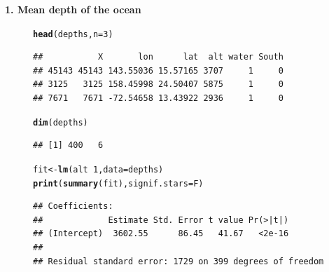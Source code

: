 \documentclass[10pt]{beamer}\usepackage[]{graphicx}\usepackage[]{color}
\makeatletter
\newcommand{\hlnum}[1]{\textcolor[rgb]{0.686,0.059,0.569}{#1}}%
\newcommand{\hlopt}[1]{\textcolor[rgb]{0,0,0}{#1}}%
\newcommand{\hlstd}[1]{\textcolor[rgb]{0.345,0.345,0.345}{#1}}%
\newcommand{\hlkwb}[1]{\textcolor[rgb]{0.69,0.353,0.396}{#1}}%
\newcommand{\hlkwc}[1]{\textcolor[rgb]{0.333,0.667,0.333}{#1}}%
\newcommand{\hlkwd}[1]{\textcolor[rgb]{0.737,0.353,0.396}{\textbf{#1}}}%
\newenvironment{kframe}{%
 \def\at@end@of@kframe{}%
 \ifinner\ifhmode%
  \def\at@end@of@kframe{\end{minipage}}%
  \begin{minipage}{\columnwidth}%
 \fi\fi%
 \def\FrameCommand##1{\hskip\@totalleftmargin \hskip-\fboxsep
 \colorbox{shadecolor}{##1}\hskip-\fboxsep
     \hskip-\linewidth \hskip-\@totalleftmargin \hskip\columnwidth}%
 \MakeFramed {\advance\hsize-\width
   \@totalleftmargin\z@ \linewidth\hsize
   \@setminipage}}%
 {\par\unskip\endMakeFramed%
 \at@end@of@kframe}
\newenvironment{knitrout}{}{} %
\makeatother
\begin{document}
\begin{frame}
\vspace*{-1.50in}
\textbf{1. Mean depth of the ocean}



\begin{figure}
	\begin{minipage}[h]{0.40\linewidth}
\begin{knitrout}\tiny
{}\color{fgcolor}\begin{kframe}
\begin{alltt}
\hlkwd{head}\hlstd{(depths,} \hlkwc{n}\hlstd{=}\hlnum{3}\hlstd{)}
\end{alltt}
\begin{verbatim}
##           X       lon      lat  alt water South
## 45143 45143 143.55036 15.57165 3707     1     0
## 3125   3125 158.45998 24.50407 5875     1     0
## 7671   7671 -72.54658 13.43922 2936     1     0
\end{verbatim}
\begin{alltt}
\hlkwd{dim}\hlstd{(depths)}
\end{alltt}
\begin{verbatim}
## [1] 400   6
\end{verbatim}
\end{kframe}
\end{knitrout}
		
	\end{minipage}
	\hspace{0.4cm}
	\begin{minipage}[h]{0.50\linewidth}
\begin{knitrout}\tiny
{}\color{fgcolor}\begin{kframe}
\begin{alltt}
\hlstd{fit} \hlkwb{<-} \hlkwd{lm}\hlstd{(alt} \hlopt{~} \hlnum{1}\hlstd{,} \hlkwc{data} \hlstd{= depths)}
\hlkwd{print}\hlstd{(}\hlkwd{summary}\hlstd{(fit),} \hlkwc{signif.stars} \hlstd{= F)}
\end{alltt}
\begin{verbatim}
## Coefficients:
##             Estimate Std. Error t value Pr(>|t|)
## (Intercept)  3602.55      86.45   41.67   <2e-16
## 
## Residual standard error: 1729 on 399 degrees of freedom
\end{verbatim}
\end{kframe}
\end{knitrout}
	\end{minipage}
\end{figure}



\end{frame}
\end{document}
